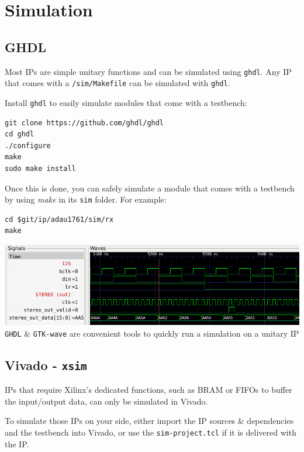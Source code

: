 \documentclass{article}
\begin{document}

\newpage
\section{Simulation}
\subsection{GHDL}

Most IPs are simple unitary functions
and can be simulated using {\tt ghdl}.
Any IP that comes with a {\tt /sim/Makefile}
can be simulated with {\tt ghdl}.

Install {\tt ghdl} to easily
simulate modules that come with a testbench:

\begin{verbatim}
git clone https://github.com/ghdl/ghdl
cd ghdl
./configure
make
sudo make install
\end{verbatim}

Once this is done, you can safely simulate a module
that comes with a testbench by using {\it make}
in its {\tt sim} folder.
For example:

\begin{verbatim}
cd $git/ip/adau1761/sim/rx
make
\end{verbatim}

\begin{center}
	\includegraphics[width=0.75\linewidth]{ghdl-gtkw.png} \\
	{\tt GHDL} \& {\tt GTK-wave} are convenient
	tools to quickly run a simulation on a unitary IP
\end{center}

\subsection{Vivado - {\tt xsim}}

IPs that require Xilinx's dedicated functions,
such as BRAM or FIFOs to buffer the input/output
data, can only be simulated in Vivado.

To simulate those IPs on your side, either
import the IP sources \& dependencies and the testbench
into Vivado, or use the {\tt sim-project.tcl} if
it is delivered with the IP.
\end{document}
